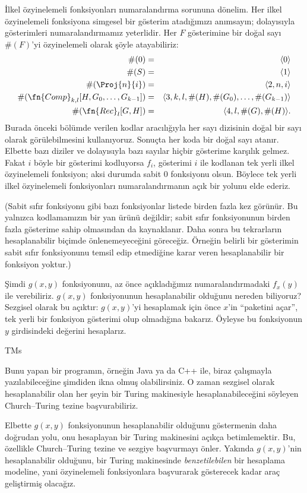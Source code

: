 İlkel özyinelemeli fonksiyonları numaralandırma sorununa dönelim. Her ilkel
özyinelemeli fonksiyona simgesel bir gösterim atadığımızı anımsayın; dolayısıyla
gösterimleri numaralandırmamız yeterlidir. Her $F$ gösterimine bir doğal sayı
$\#(F)$'yi özyinelemeli olarak şöyle atayabiliriz:
\begin{eqnarray*}
  \#(0) & = & \langle0\rangle\\
  \#(S) & = & \langle1\rangle\\
  \#(\Proj{n}{i}) & = & \langle2,n,i\rangle\\
  \#(\fn{Comp}_{k,l}[H,G_0,\dots,G_{k-1}]) & = &
    \langle3,k,l,\#(H),\#(G_0),\dots,\#(G_{k-1})\rangle\\
  \#(\fn{Rec}_l[G,H]) & = & \langle4,l,\#(G),\#(H)\rangle.
\end{eqnarray*}
Burada önceki bölümde verilen kodlar aracılığıyla her sayı dizisinin doğal
bir sayı olarak görülebilmesini kullanıyoruz. Sonuçta her koda bir doğal sayı
atanır. Elbette bazı diziler ve dolayısıyla bazı sayılar hiçbir gösterime
karşılık gelmez. Fakat $i$ böyle bir gösterimi kodluyorsa $f_i$, gösterimi
$i$ ile kodlanan tek yerli ilkel özyinelemeli fonksiyon; aksi durumda sabit
$0$ fonksiyonu olsun. Böylece tek yerli ilkel özyinelemeli fonksiyonları
numaralandırmanın açık bir yolunu elde ederiz.

(Sabit sıfır fonksiyonu gibi bazı fonksiyonlar listede birden fazla kez
görünür. Bu yalnızca kodlamamızın bir yan ürünü değildir; sabit sıfır
fonksiyonunun birden fazla gösterime sahip olmasından da kaynaklanır. Daha
sonra bu tekrarların hesaplanabilir biçimde önlenemeyeceğini göreceğiz.
Örneğin belirli bir gösterimin sabit sıfır fonksiyonunu temsil edip etmediğine
karar veren hesaplanabilir bir fonksiyon yoktur.)

Şimdi $g(x,y)$ fonksiyonunu, az önce açıkladığımız numaralandırmadaki
$f_x(y)$ ile verebiliriz. $g(x,y)$ fonksiyonunun hesaplanabilir olduğunu
nereden biliyoruz? Sezgisel olarak bu açıktır: $g(x,y)$'yi hesaplamak için
önce $x$'in ``paketini açar'', tek yerli bir fonksiyon gösterimi olup
olmadığına bakarız. Öyleyse bu fonksiyonun $y$ girdisindeki değerini
hesaplarız.

\begin{tagblock}{TMs}
\begin{digress}
Bunu yapan bir programın, örneğin Java ya da C++ ile, biraz çalışmayla
yazılabileceğine şimdiden ikna olmuş olabilirsiniz. O zaman sezgisel olarak
hesaplanabilir olan her şeyin bir Turing makinesiyle hesaplanabileceğini
söyleyen Church--Turing tezine başvurabiliriz.

Elbette $g(x,y)$ fonksiyonunun hesaplanabilir olduğunu göstermenin daha
doğrudan yolu, onu hesaplayan bir Turing makinesini açıkça betimlemektir. Bu,
özellikle Church--Turing tezine ve sezgiye başvurmayı önler. Yakında
$g(x,y)$'nin hesaplanabilir olduğunu, bir Turing makinesinde
\emph{benzetilebilen} bir hesaplama modeline, yani özyinelemeli fonksiyonlara
başvurarak gösterecek kadar araç geliştirmiş olacağız.
\end{digress}
\end{tagblock}

